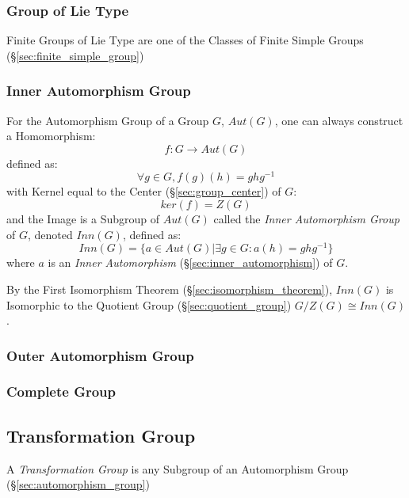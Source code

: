 \subsubsection{Group of Lie Type}\label{sec:lie_type_group}

Finite Groups of Lie Type are one of the Classes of Finite Simple Groups
(\S\ref{sec:finite_simple_group})



\subsubsection{Inner Automorphism Group}\label{sec:inner_automorphism_group}

For the Automorphism Group of a Group $G$, $Aut(G)$, one can always
construct a Homomorphism:
\[
    f : G \rightarrow Aut(G)
\]
defined as:
\[
    \forall g \in G, f (g) (h) = g h g^{-1}
\]
with Kernel equal to the Center (\S\ref{sec:group_center}) of $G$:
\[
    ker(f) = Z(G)
\]
and the Image is a Subgroup of $Aut(G)$ called the \emph{Inner
  Automorphism Group} of $G$, denoted $Inn(G)$, defined as:
\[
    Inn(G) = \{ a \in Aut(G) | \exists g \in G : a(h) = g h g^{-1} \}
\]
where $a$ is an \emph{Inner Automorphism}
(\S\ref{sec:inner_automorphism}) of $G$.

By the First Isomorphism Theorem (\S\ref{sec:isomorphism_theorem}),
$Inn(G)$ is Isomorphic to the Quotient Group
(\S\ref{sec:quotient_group}) $G / Z(G) \cong Inn(G)$.



\subsubsection{Outer Automorphism Group}\label{sec:outer_automorphism_group}

\subsubsection{Complete Group}\label{sec:complete_group}



\subsection{Transformation Group}\label{sec:transformation_group}

A \emph{Transformation Group} is any Subgroup of an Automorphism Group
(\S\ref{sec:automorphism_group})

